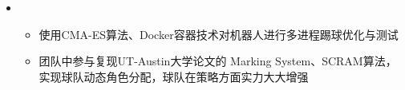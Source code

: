 \begin{itemize}[leftmargin=*]
  \item
        {\small
          \begin{itemize}
            \item 使用CMA-ES算法、Docker容器技术对机器人进行多进程踢球优化与测试
            \item 团队中参与复现UT-Austin大学论文的 Marking System、SCRAM算法，实现球队动态角色分配，球队在策略方面实力大大增强
          \end{itemize}
        }
\end{itemize}